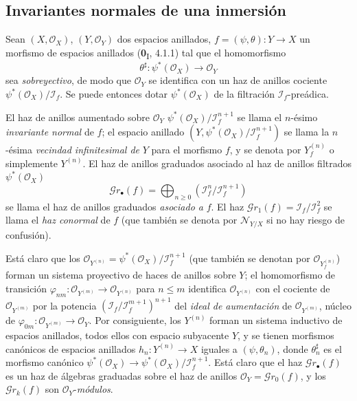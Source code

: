 \subsection{Invariantes normales de una inmersión}
\label{IV.16.1}

\begin{env}[16.1.1]
\label{IV.16.1.1}
Sean $(X,\mathcal{O}_X)$, $(Y,\mathcal{O}_Y)$ dos espacios anillados,
$f=(\psi,\theta):Y\to X$ un morfismo de espacios anillados (\textbf{0}\textsubscript{I}, 4.1.1)
tal que el homomorfismo
\[
  \theta^\sharp:\psi^*(\mathcal{O}_X)\longrightarrow\mathcal{O}_Y
\]
sea \emph{sobreyectivo}, de modo que $\mathcal{O}_Y$ se identifica con un haz de anillos cociente
$\psi^*(\mathcal{O}_X)/\mathscr{I}_f$. Se puede entonces dotar
$\psi^*(\mathcal{O}_X)$ de la filtración $\mathscr{I}_f$-preádica.
\end{env}

\begin{definition}[16.1.2]
\label{IV.16.1.2}
El haz de anillos aumentado sobre $\mathcal{O}_Y$
$\psi^*(\mathcal{O}_X)/\mathscr{I}_f^{n+1}$ se llama el $n$-ésimo \emph{invariante normal}
de $f$; el espacio anillado
$(Y,\psi^*(\mathcal{O}_X)/\mathscr{I}_f^{n+1})$ se llama la $n$-ésima \emph{vecindad
infinitesimal de} $Y$ para el morfismo $f$, y se denota por $Y_f^{(n)}$ o simplemente
$Y^{(n)}$. El haz de anillos graduados asociado al haz de anillos filtrados
$\psi^*(\mathcal{O}_X)$
\[
  \mathscr{G}r_\bullet(f)=\bigoplus_{n\geq 0}
  (\mathscr{I}_f^n/\mathscr{I}_f^{n+1})
  \tag{16.1.2.1}
  \label{IV.16.1.2.1}
\]
se llama el haz de anillos graduados \emph{asociado a} $f$. El haz
$\mathscr{G}r_1(f)=\mathscr{I}_f/\mathscr{I}_f^2$ se llama el \emph{haz conormal}
de $f$ (que también se denota por $\mathscr{N}_{Y/X}$ si no hay riesgo de confusión).
\end{definition}

Está claro que los
$\mathcal{O}_{Y^{(n)}}=\psi^*(\mathcal{O}_X)/\mathscr{I}_f^{n+1}$
(que también se denotan por $\mathcal{O}_{Y_f^{(n)}}$) forman un
sistema proyectivo de haces de anillos sobre $Y$; el homomorfismo de transición
$\varphi_{nm}:\mathcal{O}_{Y^{(m)}}\to\mathcal{O}_{Y^{(n)}}$ para $n\leq m$
identifica $\mathcal{O}_{Y^{(n)}}$ con el cociente de $\mathcal{O}_{Y^{(m)}}$ por la
potencia $(\mathscr{I}_f/\mathscr{I}_f^{m+1})^{n+1}$ del \emph{ideal de aumentación} de
$\mathcal{O}_{Y^{(m)}}$, núcleo de
$\varphi_{0m}:\mathcal{O}_{Y^{(m)}}\to\mathcal{O}_Y$. Por consiguiente, los $Y^{(n)}$ forman
un sistema inductivo de espacios anillados, todos ellos con espacio subyacente
$Y$, y se tienen morfismos canónicos de espacios anillados
$h_n:Y^{(n)}\to X$ iguales a $(\psi,\theta_n)$, donde $\theta_n^\sharp$ es el morfismo
canónico
$\psi^*(\mathcal{O}_X)\to\psi^*(\mathcal{O}_X)/\mathscr{I}_f^{n+1}$.
Está claro que el haz $\mathscr{G}r_\bullet(f)$ es un haz de álgebras
graduadas sobre el haz de anillos
$\mathcal{O}_Y=\mathscr{G}r_0(f)$, y los $\mathscr{G}r_k(f)$ son
$\mathcal{O}_Y$-\emph{módulos}.

